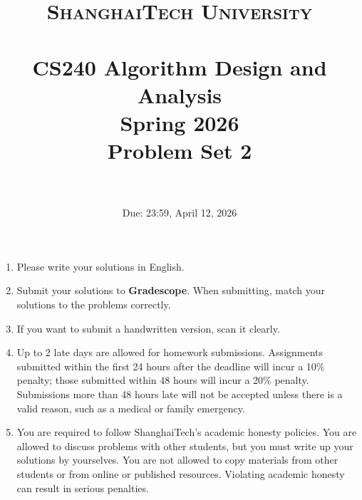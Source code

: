 \documentclass{article}
\title{
    \normalfont \normalsize
    \textsc{ShanghaiTech University} \\ [25pt]
    \horrule{0.5pt} \\[0.4cm] %
    \huge CS240 Algorithm Design and Analysis \\ %
    \LARGE Spring 2026\\
    \LARGE Problem Set 2\\
    \horrule{2pt} \\[0.5cm] %
}
\author{}
\date{Due: 23:59, April 12, 2026}
\begin{document}
\maketitle
\vspace{3ex}

\begin{enumerate}
\item Please write your solutions in English. 
\item Submit your solutions to \textbf{Gradescope}. When submitting, match your solutions to the
problems correctly.
\item If you want to submit a handwritten version, scan it clearly.
\item Up to 2 late days are allowed for homework submissions. Assignments submitted within the first 24 hours after the deadline will incur a 10\% penalty; those submitted within 48 hours will incur a 20\% penalty. Submissions more than 48 hours late will not be accepted unless there is a valid reason, such as a medical or family emergency.
\item You are required to follow ShanghaiTech's academic honesty policies. You are allowed to discuss problems with other students, but you must write up your solutions by yourselves. You are not allowed to copy materials from other students or from online or published resources. Violating academic honesty can result in serious penalties.  
\end{enumerate}

\newpage

 
% 

% 
 
% 

% 
 
% 

% 
\end{document}
